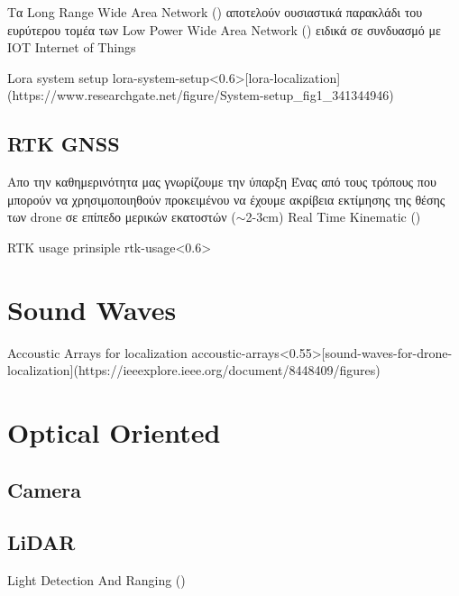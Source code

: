 Τα Long Range Wide Area Network () αποτελούν ουσιαστικά παρακλάδι του ευρύτερου τομέα των Low Power Wide Area 
Network () ειδικά σε συνδυασμό με IOT Internet of Things 

{Lora system setup}
{lora-system-setup}<0.6>[lora-localization](https://www.researchgate.net/figure/System-setup_fig1_341344946)


\cite{lora-localization}

\subsection{RTK GNSS}
Απο την καθημερινότητα μας γνωρίζουμε την ύπαρξη 
Ένας από τους τρόπους που μπορούν να χρησιμοποιηθούν προκειμένου να έχουμε ακρίβεια εκτίμησης
της θέσης των drone σε επίπεδο μερικών εκατοστών ($\sim$2-3cm)
Real Time Kinematic ()

\cite{rtk-gps-drone-localization}

{RTK usage prinsiple}
{rtk-usage}<0.6>

\section{Sound Waves}

\cite{sound-waves-for-drone-localization}

{Accoustic Arrays for localization}
{accoustic-arrays}<0.55>[sound-waves-for-drone-localization](https://ieeexplore.ieee.org/document/8448409/figures)

\section{Optical Oriented}


\subsection{Camera}

\subsection{LiDAR}
Light Detection And Ranging ()
 
